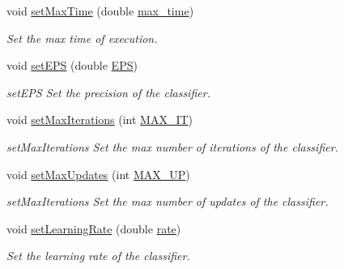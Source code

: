 \begin{DoxyCompactItemize}
void \mbox{\hyperlink{class_classifier_a1919729daad9103144bffbd189b9fac9}{set\+Max\+Time}} (double \mbox{\hyperlink{class_classifier_ab7c1a6d53cbf26ea2517df83a9ab8ee0}{max\+\_\+time}})
\begin{DoxyCompactList}\small\item\em Set the max time of execution. \end{DoxyCompactList}\item 
void \mbox{\hyperlink{class_classifier_a47b520ded0313a3cdcab8691cdd28257}{set\+E\+PS}} (double \mbox{\hyperlink{class_classifier_a690342152fdf43a17e67afad15d86503}{E\+PS}})
\begin{DoxyCompactList}\small\item\em set\+E\+PS Set the precision of the classifier. \end{DoxyCompactList}\item 
void \mbox{\hyperlink{class_classifier_af3ea28f2e4b7ea19469892ec901b5bb6}{set\+Max\+Iterations}} (int \mbox{\hyperlink{class_classifier_a3b7f1c31910fff58907bcfe2cfc6cf89}{M\+A\+X\+\_\+\+IT}})
\begin{DoxyCompactList}\small\item\em set\+Max\+Iterations Set the max number of iterations of the classifier. \end{DoxyCompactList}\item 
void \mbox{\hyperlink{class_classifier_a343905df8798ef1e29983d4582a1cdb6}{set\+Max\+Updates}} (int \mbox{\hyperlink{class_classifier_a8d3289755d689efa65ca009d4c4ffa13}{M\+A\+X\+\_\+\+UP}})
\begin{DoxyCompactList}\small\item\em set\+Max\+Iterations Set the max number of updates of the classifier. \end{DoxyCompactList}\item 
void \mbox{\hyperlink{class_classifier_ae705171568ea2066b619609af614129e}{set\+Learning\+Rate}} (double \mbox{\hyperlink{class_classifier_a7b1c4ef87631bd9e46682e5bc4315111}{rate}})
\begin{DoxyCompactList}\small\item\em Set the learning rate of the classifier. \end{DoxyCompactList}\end{DoxyCompactItemize}
